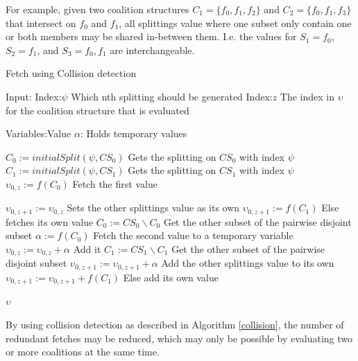 \documentclass{llncs}
\begin{document}
For example, given two coalition structures $C_1 =\{f_0,f_1,f_2\}$ and $C_2 =\{f_0,f_1,f_3\}$ that intersect on $f_0$ and $f_1$, all splittings value where one subset only contain one or both members may be shared in-between them. I.e. the values for $S_1 = {f_0}$, $S_2 = {f_1}$, and $S_3 = {f_0,f_1}$ are interchangeable.

\begin{algorithm}[htbp]
\caption{Fetch using Collision detection \label{collision}}
Input:
Index:$\psi$ \hfill Which nth splitting should be generated
Index:$z$ \hfill The index in $\upsilon$ for the coalition structure that is evaluated 

Variables:Value $\alpha $: \hfill Holds temporary values

\begin{algorithmic}[1]
    \STATE $C_{0} := initialSplit(\psi,CS_0)$ \label{lst:line:startcol} \hfill Gets the splitting on $CS_0$ with index $\psi$
    \STATE $C_{1} := initialSplit(\psi,CS_1)$ \hfill Gets the splitting on $CS_1$ with index $\psi$
    \STATE $\upsilon_{0,z} := f(C_{0})$ \label{lst:line:fetch} \hfill Fetch the first value
    
     \label{lst:line:firstif} 
      \STATE $\upsilon_{0,z+1} := \upsilon_{0,z}$ \hfill Sets the other splittings value as its own
      \ELSE
      \STATE $\upsilon_{0,z+1} := f(C_{1})$ \hfill Else fetches its own value
     \ENDIF \label{lst:line:firstifend}
    \STATE $C_{0} := CS_0\backslash C_{0}$ \label{lst:line:startend} \hfill Get the other subset of the pairwise disjoint subset
    \STATE $\alpha := f(C_{0})$ \hfill Fetch the second value to a temporary variable
    \STATE $\upsilon_{0,z} := \upsilon_{0,z}  + \alpha$ \label{lst:line:endend} \hfill Add it
    \STATE $C_{1} := CS_1\backslash C_{1}$ \hfill Get the other subset of the pairwise disjoint subset
      \STATE $\upsilon_{0,z+1} := \upsilon_{0,z+1}  + \alpha$ \hfill Add the other splittings value to its own
    \ELSE
      \STATE $\upsilon_{0,z+1} := \upsilon_{0,z+1} + f(C_{1})$ \hfill Else add its own value
    \ENDIF
    
\RETURN $\upsilon$
\end{algorithmic}
\end{algorithm}
By using collision detection as described in Algorithm \ref{collision}, the number of redundant fetches may be reduced,
which may only be possible by evaluating two or more coalitions at the same time. 
\end{document}
